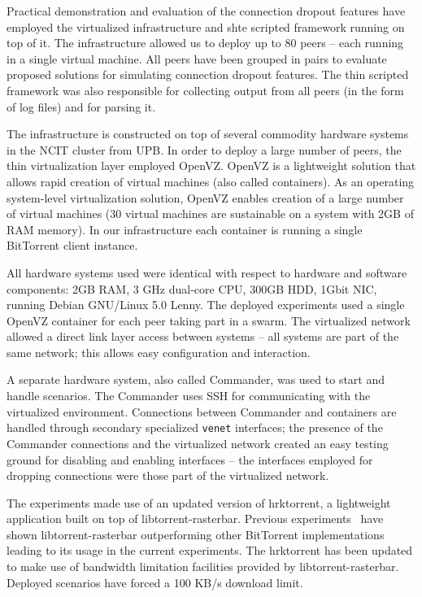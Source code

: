 Practical demonstration and evaluation of the connection dropout features
have employed the virtualized infrastructure and shte scripted framework
running on top of it. The infrastructure allowed us to deploy up to 80 peers
-- each running in a single virtual machine. All peers have been grouped in
pairs to evaluate proposed solutions for simulating connection dropout
features. The thin scripted framework was also responsible for collecting
output from all peers (in the form of log files) and for parsing it.

The infrastructure is constructed on top of several commodity hardware systems
in the NCIT cluster from UPB. In order to
deploy a large number of peers, the thin virtualization layer employed OpenVZ.
OpenVZ is a lightweight solution that allows rapid creation of
virtual machines (also called containers). As an operating system-level
virtualization solution, OpenVZ enables creation of a large number of virtual
machines (30 virtual machines are sustainable on a system with 2GB of RAM
memory). In our infrastructure each container is running a single BitTorrent
client instance.

All hardware systems used were identical with respect to hardware and software
components: 2GB RAM, 3 GHz dual-core CPU, 300GB HDD, 1Gbit NIC, running Debian
GNU/Linux 5.0 Lenny. The deployed experiments used a single OpenVZ container
for each peer taking part in a swarm. The virtualized network
allowed a direct link layer access between systems -- all systems are part of
the same network; this allows easy configuration and interaction.

A separate hardware system, also called Commander, was used to start and
handle scenarios. The Commander uses SSH for communicating with the
virtualized environment. Connections between Commander and containers are
handled through secondary specialized \texttt{venet} interfaces; the presence
of the Commander connections and the virtualized network created an easy
testing ground for disabling and enabling interfaces -- the interfaces
employed for dropping connections were those part of the virtualized network.

The experiments made use of an updated version of hrktorrent, a lightweight
application built on top of libtorrent-rasterbar. Previous
experiments~\cite{bt-vi} have shown libtorrent-rasterbar outperforming other
BitTorrent implementations leading to its usage in the current experiments.
The hrktorrent has been updated to make use of bandwidth limitation facilities
provided by libtorrent-rasterbar.  Deployed scenarios have forced a 100 KB/s
download limit.

